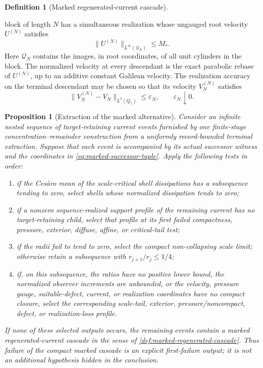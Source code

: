 \documentclass[11pt]{amsart}
\numberwithin{equation}{section}
\theoremstyle{plain}
\newtheorem{proposition}[proposition]{Proposition}
\theoremstyle{definition}
\newtheorem{definition}[definition]{Definition}
\theoremstyle{remark}
\begin{document}
\begin{definition}[Marked regenerated-current cascade]
\begin{enumerate}[label=\textup{(R\arabic*)},leftmargin=2.8em]
block of length \(N\) has a simultaneous realization whose ungauged root velocity
\(U^{(N)}\) satisfies
\begin{equation}\label{eq:bounded-root-finite-realization}
 \|U^{(N)}\|_{L^\infty(\mathcal Q_N)}\le M_*.
\end{equation}
Here \(\mathcal Q_N\) contains the images, in root coordinates, of all unit
cylinders in the block.  The normalized velocity at every descendant is the
exact parabolic rebase of \(U^{(N)}\), up to an additive constant Galilean
velocity.  The realization accuracy on the terminal descendant may be chosen
so that its velocity \(V_N^{(N)}\) satisfies
\begin{equation}\label{eq:bounded-terminal-realization-accuracy}
 \|V_N^{(N)}-V_N\|_{L^3(Q_1)}\le\varepsilon_N,
 \qquad \varepsilon_N\downarrow0.
\end{equation}
\end{enumerate}
\end{definition}

\begin{proposition}[Extraction of the marked alternative]
\label{prop:marked-alternative-extraction}
Consider an infinite nested sequence of target-retaining current events
furnished by one finite-stage concentration--remainder construction from a
uniformly record-bounded terminal extraction.  Suppose that each event is
accompanied by its actual successor witness and the coordinates in
\eqref{eq:marked-successor-tuple}.  Apply the following tests in order:
\begin{enumerate}[label=\textup{(E\arabic*)},leftmargin=2.8em]
\item if the Ces\`aro mean of the scale-critical shell dissipations has a
subsequence tending to zero, select shells whose normalized dissipation tends
to zero;
\item if a nonzero sequence-realized support profile of the remaining current
has no target-retaining child, select that profile at its first failed
compactness, pressure, exterior, diffuse, affine, or critical-tail test;
\item if the radii fail to tend to zero, select the compact
non-collapsing scale limit; otherwise retain a subsequence with
\(r_{j+1}/r_j\le1/4\);
\item if, on this subsequence, the ratios have no positive lower bound, the
normalized observer increments are unbounded, or the velocity, pressure
gauge, suitable-defect, current, or realization coordinates have no compact
closure, select the corresponding scale-tail, exterior, pressure/noncompact,
defect, or realization-loss profile.
\end{enumerate}
If none of these selected outputs occurs, the remaining events contain a
marked regenerated-current cascade in the sense of
\cref{def:marked-regenerated-cascade}.  Thus failure of the compact marked
cascade is an explicit first-failure output; it is not an additional hypothesis hidden in
the conclusion.
\end{proposition}
\end{document}
